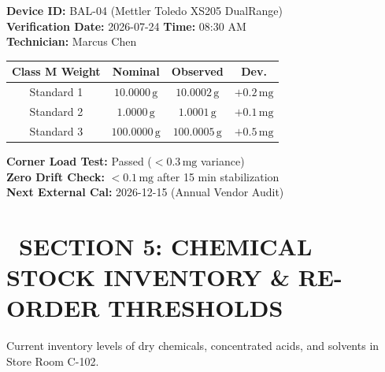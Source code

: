 \documentclass[10pt,a4paper]{article}
\begin{document}
\begin{minipage}[t]{0.485\textwidth}
  \begin{tcolorbox}[labcardnavy, title={\small\bfseries\color{white}\faWeight\ Analytical Balance Daily Verification}, coltitle=white, colbacktitle=labnavy]
    \scriptsize
    \textbf{Device ID:} BAL-04 (Mettler Toledo XS205 DualRange)\\
    \textbf{Verification Date:} 2026-07-24 \quad \textbf{Time:} 08:30 AM\\
    \textbf{Technician:} Marcus Chen

    \vspace{2pt}
    \begin{tabularx}{\textwidth}{@{}cccc@{}}
      \toprule
      \rowcolor{labbg}
      \textbf{Class M Weight} & \textbf{Nominal} & \textbf{Observed} & \textbf{Dev.} \\
      \midrule
      Standard 1 & $10.0000\,\text{g}$ & $10.0002\,\text{g}$ & $+0.2\,\text{mg}$ \\
      Standard 2 & $1.0000\,\text{g}$ & $1.0001\,\text{g}$ & $+0.1\,\text{mg}$ \\
      Standard 3 & $100.0000\,\text{g}$ & $100.0005\,\text{g}$ & $+0.5\,\text{mg}$ \\
      \bottomrule
    \end{tabularx}

    \vspace{2pt}
    {\tiny\color{labtext}
    \textbf{Corner Load Test:} Passed ($< 0.3\,\text{mg}$ variance)\\
    \textbf{Zero Drift Check:} $< 0.1\,\text{mg}$ after 15 min stabilization\\
    \textbf{Next External Cal:} 2026-12-15 (Annual Vendor Audit)
    }
  \end{tcolorbox}
\end{minipage}

\vspace{4pt}

{\section*{{\Large\bfseries\color{labnavy}\faBoxes\ SECTION 5: CHEMICAL STOCK INVENTORY \& RE-ORDER THRESHOLDS}}}
\vspace{-6pt}
{\small\color{labtext}Current inventory levels of dry chemicals, concentrated acids, and solvents in Store Room C-102.}

\vspace{4pt}
\end{document}
